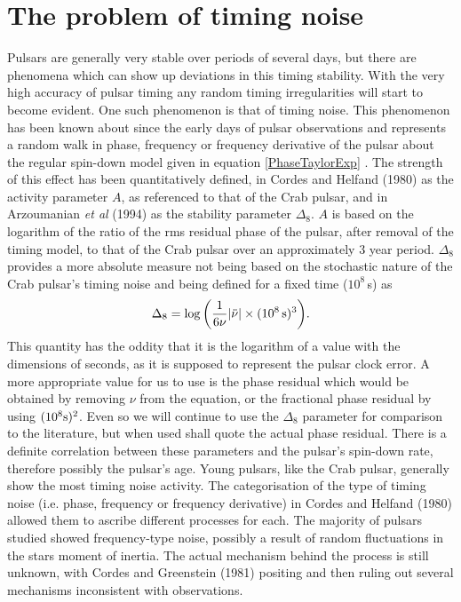 \section{The problem of timing noise}\label{TimingNoise}
Pulsars are generally very stable over periods of several days, but there are phenomena which 
can show up deviations in this timing stability. With the very high accuracy of pulsar timing
any random timing irregularities will start to become evident. One such phenomenon is that of timing
noise. This phenomenon has been known about since the early days of pulsar observations and
represents a random walk in phase, frequency or frequency derivative of the pulsar about the regular
spin-down model given in equation \ref{PhaseTaylorExp} \cite{CordesHelfand:1980}. The strength of
this effect has been quantitatively defined, in Cordes and Helfand (1980) \cite{CordesHelfand:1980}
as the activity parameter $A$, as referenced to that of the Crab pulsar, and in Arzoumanian {\it et
al} (1994) \cite{Arzoumanian:1994} as the stability parameter $\Delta_8$. $A$ is based on the
logarithm of the ratio of the rms residual phase of the pulsar, after removal of the timing model,
to that of the Crab pulsar over an approximately 3 year period. $\Delta_8$ provides a more absolute
measure not being based on the stochastic nature of the Crab pulsar's timing noise and being
defined for a fixed time ($10^8$\,s) as
\begin{equation}\label{delta8}
\Delta_8 = \log{\left(\frac{1}{6\nu}|\ddot{\nu}|\times (10^8\,{\rm s})^3\right)}.
\end{equation}
This quantity has the oddity that it is the logarithm of a value with the dimensions of seconds, as
it is supposed to represent the pulsar clock error. A more appropriate value for us to use is the
phase residual which would be obtained by removing $\nu$ from the equation, or the fractional
phase residual by using $(10^8{\rm s})^2$. Even so we will continue to use the $\Delta_8$ parameter
for comparison to the literature, but when used shall quote the actual phase residual. There is a
definite correlation between these parameters and the pulsar's spin-down rate, therefore possibly
the pulsar's age. Young pulsars, like the Crab pulsar, generally show the most timing noise
activity. The categorisation of the type of timing noise (i.e. phase, frequency or frequency
derivative) in Cordes and Helfand (1980) \cite{CordesHelfand:1980} allowed them to ascribe different
processes for each. The majority of pulsars studied showed frequency-type noise, possibly a result
of random fluctuations in the stars moment of inertia. The actual mechanism behind the process is
still unknown, with Cordes and Greenstein (1981) \cite{CordesGreenstein:1981} positing and then
ruling out several mechanisms inconsistent with observations.

